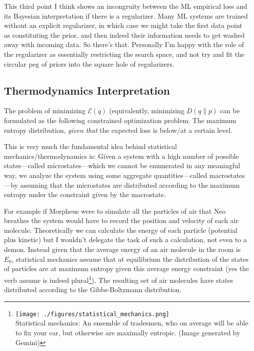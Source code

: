 \documentclass[12pt]{amsart}
\begin{document}
This third point I think shows an incongruity between the ML empirical loss and its Bayesian interpretation if there is a regularizer. Many ML systems are trained without an explicit regularizer, in which case we might take the first data point as constituting the prior, and then indeed their information needs to get washed away with incoming data. So there's that. Personally I'm happy with the role of the regularizer as essentially restricting the search space, and not try and fit the circular peg of priors into the square hole of regularizers.

\subsection*{Thermodynamics Interpretation}

The problem of minimizing $\mathcal{E}(q)$ (equivalently, minimizing $D(q\|p)$ can be formulated as the following constrained optimization problem. The maximum entropy distribution, \emph{given that} the expected loss is below/at a certain level.

This is very much the fundamental idea behind statistical mechanics/thermodynamics is: Given a system with a high number of possible states---called microstates---which we cannot be enumerated in any meaningful way, we analyze the system using some aggregate quantities---called macrostates---by assuming that the microstates are distributed according to the maximum entropy under the constraint given by the macrostate. 

For example if Morpheus were to simulate all the particles of air that Neo breathes the system would have to record the position and velocity of each air molecule. Theoretically we can calculate the energy of each particle (potential plus kinetic) but I wouldn't delegate the task of such a calculation, not even to a demon. Instead given that the average energy of an air molecule in the room is $E_0$, statistical mechanics assume that at equilibrium the distribution of the states of particles are at maximum entropy given this average energy constraint (yes the verb assume is indeed plural\footnote{\texttt{[image: ./figures/statistical\_mechanics.png]} \\Statistical mechanics: An ensemble of tradesmen, who on average will be able to fix your car, but otherwise are maximally entropic. \tiny{(Image generated by Gemini)}}). The resulting set of air molecules have states distributed according to the Gibbs-Boltzmann distribution. 
\end{document}

